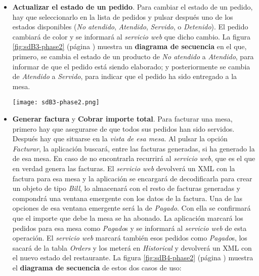\begin{itemize}
  \begin{sidewaysfigure}[h]
    \begin{center}
      \texttt{[image: sdB2-phase2.png]}
      \caption{Diagrama de secuencia del caso de uso \emph{añadir un nuevo
      pedido (manual)}.}
      \label{fig:sdB2-phase2}
    \end{center}
  \end{sidewaysfigure}

\item \textbf{Actualizar el estado de un pedido}. Para cambiar el estado de
un pedido, hay que seleccionarlo en la lista de pedidos y pulsar después uno
de los estados disponibles (\emph{No atendido}, \emph{Atendido},
\emph{Servido}, o \emph{Detenido}). El pedido cambiará de color y se informará
al \emph{servicio web} que dicho cambio.
La figura \ref{fig:sdB3-phase2} (página \pageref{fig:sdB3-phase2}) muestra
un \textbf{diagrama de secuencia} en el que, primero, se cambia el estado de
un producto de \emph{No atendido} a \emph{Atendido}, para informar de que
el pedido está siendo elaborado; y posteriormente se cambia de \emph{Atendido}
a \emph{Servido}, para indicar que el pedido ha sido entregado a la mesa.

  \begin{sidewaysfigure}[h]
    \begin{center}
      \texttt{[image: sdB3-phase2.png]}
      \caption{Diagrama de secuencia del caso de uso \emph{actualizar
      estado de un pedido} de \emph{No atendido} a \emph{Servido}.}
      \label{fig:sdB3-phase2}
    \end{center}
  \end{sidewaysfigure}

\item \textbf{Generar factura} y  \textbf{Cobrar importe total}. Para
facturar una mesa, primero hay que asegurarse de que todos sus pedidos han
sido servidos. Después hay que situarse en la \emph{vista de esa mesa}.
Al pulsar la opción \emph{Facturar}, la aplicación buscará, entre las facturas
generadas, si ha generado la de esa mesa. En caso de no encontrarla recurrirá
al \emph{servicio web}, que es el que en verdad genera las facturas. El
\emph{servicio web} devolverá un \acs{XML} con la factura para esa mesa y la 
aplicación se encargará de decodificarla para crear un objeto de tipo
\emph{Bill}, lo almacenará con el resto de facturas generadas y compondrá
una ventana emergente con los datos de la factura. Una de las opciones de
esa ventana emergente será la de \emph{Pagado}. Con ella se confirmará que
el importe que debe la mesa se ha abonado. La aplicación marcará los
pedidos para esa mesa como \emph{Pagado}s y se informará al \emph{servicio
web} de esta operación. El \emph{servicio web} marcará también esos pedidos
como \emph{Pagado}s, los sacará de la tabla \emph{Orders} y los meterá en
\emph{Historical} y devolverá un \acs{XML} con el nuevo estado del
restaurante. La figura \ref{fig:sdB4-phase2} (página \pageref{fig:sdB4-phase2})
muestra el \textbf{diagrama de secuencia} de estos dos casos de uso:


\end{itemize}
